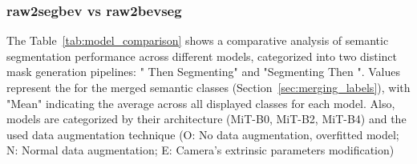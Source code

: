 \subsubsection{raw2segbev vs raw2bevseg}
The Table~\ref{tab:model_comparison} shows a comparative analysis of semantic segmentation performance across different models, categorized into two distinct  mask generation pipelines: " Then Segmenting" and "Segmenting Then ". Values represent the  for the merged semantic classes (Section~\ref{sec:merging_labels}), with "Mean" indicating the average  across all displayed classes for each model. Also, models are categorized by their architecture (MiT-B0, MiT-B2, MiT-B4) and the used data augmentation technique (O: No data augmentation, overfitted model; N: Normal data augmentation; E: Camera's extrinsic parameters modification)

